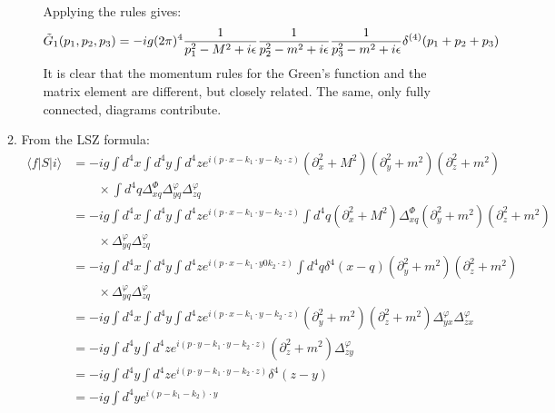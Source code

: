 \documentclass[12pt,a4]{article}
\begin{document}
\begin{enumerate}
\begin{enumerate}
\begin{enumerate}
            Applying the rules gives:
              \begin{equation*}
              \tilde G_1(p_1, p_2, p_3) = -ig (2 \pi)^{4} \frac{1}{p_1^2 - M^2 + i \epsilon} \frac{1}{p_2^2 - m^2 + i \epsilon}\frac{1}{p_3^2 - m^2 + i \epsilon}\delta^{(4)}(p_1 + p_2 + p_3)\\
              \end{equation*}
              It is clear that the momentum rules for the Green's function and the matrix element are different, but closely related.
              The same, only fully connected, diagrams contribute.
        \end{enumerate}
      \item
        From the LSZ formula:
        \begin{align*}
          \langle f | S | i \rangle &= -ig\int d^4x \int d^4y \int d^4z e^{i(p \cdot x - k_1 \cdot y - k_2 \cdot z)} (\partial_x^2 + M^2)(\partial_y^2 + m^2)(\partial_z^2 + m^2) \\
                                    & \qquad \times \int d^4 q\Delta^{\Phi}_{xq} \Delta^{\varphi}_{yq}\Delta^{\varphi}_{zq}\\
                                    &= -ig \int d^4x \int d^4y \int d^4z e^{i(p \cdot x - k_1 \cdot y - k_2 \cdot z)} \int d^4 q  (\partial_x^2 + M^2) \Delta^{\Phi}_{xq} (\partial_y^2 + m^2)(\partial_z^2 + m^2) \\
                                    & \qquad \times  \Delta^{\varphi}_{yq}\Delta^{\varphi}_{zq}\\
                                    &= -ig \int d^4x \int d^4y \int d^4z e^{i(p \cdot x - k_1 \cdot y 0 k_2 \cdot z)} \int d^4 q \delta^4(x - q) (\partial_y^2 + m^2)(\partial_z^2 + m^2) \\
                                    & \qquad \times  \Delta^{\varphi}_{yq}\Delta^{\varphi}_{zq}\\
                                    &= -ig \int d^4x \int d^4y \int d^4z e^{i(p \cdot x - k_1 \cdot y - k_2 \cdot z)} (\partial_y^2 + m^2)(\partial_z^2 + m^2) \Delta^{\varphi}_{yx}\Delta^{\varphi}_{zx}\\
                                    &= -ig \int d^4y \int d^4z e^{i(p \cdot y - k_1 \cdot y - k_2 \cdot z)} (\partial_z^2 + m^2) \Delta^{\varphi}_{zy}\\
                                    &= -ig \int d^4y \int d^4z e^{i(p \cdot y - k_1 \cdot y - k_2 \cdot z)} \delta^4(z - y)\\
                                    &= -ig \int d^4y e^{i(p  - k_1 - k_2)\cdot y} \\

\end{align*}
\end{enumerate}
\end{enumerate}
\end{document}
